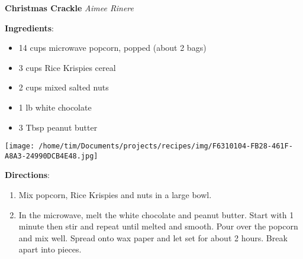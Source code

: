 \documentclass[11pt, twoside, openany]{book}
\begin{document}
\noindent\begin{minipage}[t]{\linewidth}%
{\Large\textbf{Christmas Crackle}} \label{christmas-crackle}\hfill\textit{Aimee Rinere}\\
\noindent\begin{minipage}[t]{0.78\linewidth}%
\textbf{Ingredients}:\vspace{-3mm}
\begin{multicols}{2}
\begin{itemize}\setlength\itemsep{-1mm}
\item 14 cups microwave popcorn, popped (about 2 bags)
\item 3 cups Rice Krispies cereal
\item 2 cups mixed salted nuts
\item 1 lb white chocolate
\item 3 Tbsp peanut butter
\end{itemize}
\end{multicols}
\end{minipage}
\noindent\begin{minipage}[t]{0.18\linewidth}
\centering \strut\vspace*{-\baselineskip}\newline
\texttt{[image: /home/tim/Documents/projects/recipes/img/F6310104-FB28-461F-A8A3-24990DCB4E48.jpg]}\\
\end{minipage}\vspace{3mm}
\textbf{Directions}:
\vspace{-3mm}\begin{enumerate}\setlength\itemsep{-1mm}
\item Mix popcorn, Rice Krispies and nuts in a large bowl.
\item In the microwave, melt the white chocolate and peanut butter. Start with 1 minute then stir and repeat until melted and smooth. Pour over the popcorn and mix well. Spread onto wax paper and let set for about 2 hours. Break apart into pieces.
\end{enumerate}
\end{minipage}\vspace{8mm}
\end{document}

